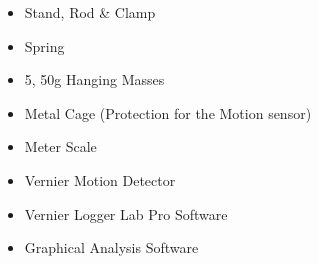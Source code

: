 \begin{itemize}
    \item {Stand, Rod \& Clamp}
    \item {Spring}
    \item {5, 50g Hanging Masses}
    \item {Metal Cage (Protection for the Motion sensor)}
    \item {Meter Scale}
    \item {Vernier Motion Detector}
    \item {Vernier Logger Lab Pro Software}
    \item {Graphical Analysis Software}
    \label{mat}
\end{itemize}


